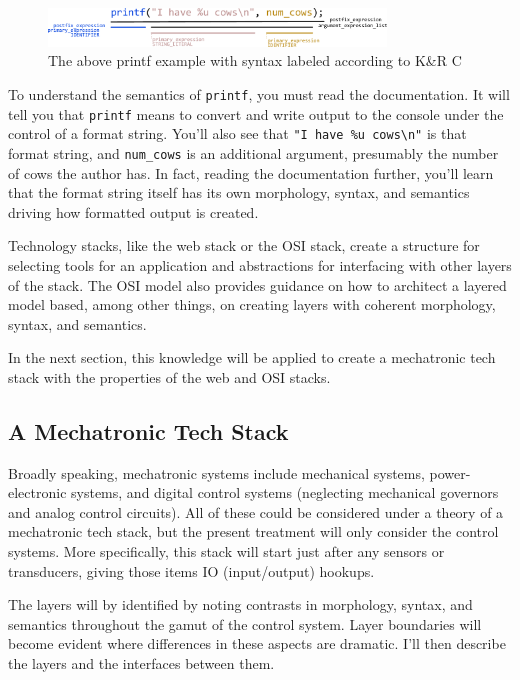 \documentclass[english,12pt,a4paper,pdftex,eng,utf8]{aaltothesis}
\begin{document}
\begin{figure}[h]
  \centering
  \includegraphics[width=0.8\textwidth]{assets/printf_syntax}
  \caption{The above printf example with syntax labeled according to K{\&}R C~\cite{Kernighan1978}}\label{fig:printf_syntax}
\end{figure}

To understand the semantics of \verb|printf|, you must read the documentation.  It will tell you that \verb|printf| means to convert and write output to the console under the control of a format string.  You'll also see that \verb|"I have %u cows\n"| is that format string, and \verb|num_cows| is an additional argument, presumably the number of cows the author has.  In fact, reading the documentation further, you'll learn that the format string itself has its own morphology, syntax, and semantics driving how formatted output is created.

Technology stacks, like the web stack or the OSI stack, create a structure for selecting tools for an application and abstractions for interfacing with other layers of the stack.  The OSI model also provides guidance on how to architect a layered model based, among other things, on creating layers with coherent morphology, syntax, and semantics.

In the next section, this knowledge will be applied to create a mechatronic tech stack with the properties of the web and OSI stacks.

\subsection{A Mechatronic Tech Stack}

Broadly speaking, mechatronic systems include mechanical systems, power-electronic systems, and digital control systems (neglecting mechanical governors and analog control circuits).  All of these could be considered under a theory of a mechatronic tech stack, but the present treatment will only consider the control systems.  More specifically, this stack will start just after any sensors or transducers, giving those items IO (input/output) hookups.

The layers will by identified by noting contrasts in morphology, syntax, and semantics throughout the gamut of the control system.  Layer boundaries will become evident where differences in these aspects are dramatic.  I'll then describe the layers and the interfaces between them.
\end{document}
